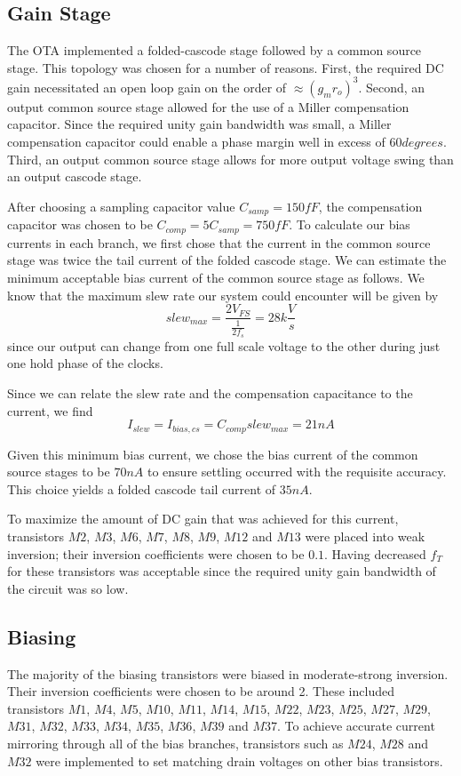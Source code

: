 \documentclass[journal]{IEEEtran}
\begin{document}
\subsection{Gain Stage}
The OTA implemented a folded-cascode stage followed by a common source stage. This topology was chosen for a number of reasons. First, the required DC gain necessitated an open loop gain on the order of $\approx \left(g_mr_o\right)^3$. Second, an output common source stage allowed for the use of a Miller compensation capacitor. Since the required unity gain bandwidth was small, a Miller compensation capacitor could enable a phase margin well in excess of $60degrees$. Third, an output common source stage allows for more output voltage swing than an output cascode stage.

After choosing a sampling capacitor value $C_{samp}=150fF$, the compensation capacitor was chosen to be $C_{comp}=5C_{samp}=750fF$. To calculate our bias currents in each branch, we first chose that the current in the common source stage was twice the tail current of the folded cascode stage. We can estimate the minimum acceptable bias current of the common source stage as follows. We know that the maximum slew rate our system could encounter will be given by
\begin{equation}
slew_{max} = \frac{2V_{FS}}{\frac{1}{2f_s}}=28k\frac{V}{s}
\end{equation}
since our output can change from one full scale voltage to the other during just one hold phase of the clocks.

Since we can relate the slew rate and the compensation capacitance to the current, we find
\begin{equation}
I_{slew}=I_{bias,cs} = C_{comp}slew_{max}=21nA
\end{equation}

Given this minimum bias current, we chose the bias current of the common source stages to be $70nA$ to ensure settling occurred with the requisite accuracy. This choice yields a folded cascode tail current of $35nA$.

To maximize the amount of DC gain that was achieved for this current, transistors $M2$, $M3$, $M6$, $M7$, $M8$, $M9$, $M12$ and $M13$ were placed into weak inversion; their inversion coefficients were chosen to be $0.1$. Having decreased $f_T$ for these transistors was acceptable since the required unity gain bandwidth of the circuit was so low.

\subsection{Biasing}
The majority of the biasing transistors were biased in moderate-strong inversion. Their inversion coefficients were chosen to be around 2. These included transistors $M1$, $M4$, $M5$, $M10$, $M11$, $M14$, $M15$, $M22$, $M23$, $M25$, $M27$, $M29$, $M31$, $M32$, $M33$, $M34$, $M35$, $M36$, $M39$ and $M37$. To achieve accurate current mirroring through all of the bias branches, transistors such as $M24$, $M28$ and $M32$ were implemented to set matching drain voltages on other bias transistors.
\end{document}
